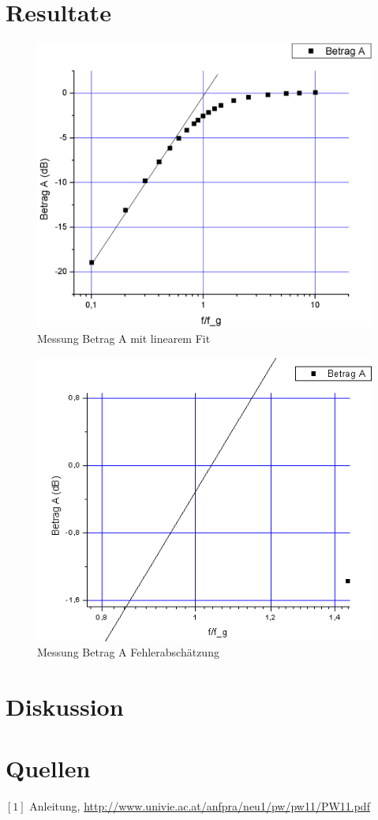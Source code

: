\documentclass[12pt,a4paper]{article}
\begin{document}
\begin{multicols}{2}
\section{Resultate}
\begin{figure}[H]
	\centering
	\includegraphics[scale=0.25]{./figure/betrag_a.png}
	\caption{Messung Betrag A mit linearem Fit}
	\label{fig:betraga_linfit}
\end{figure}
\begin{figure}[H]
	\centering
	\includegraphics[scale=0.45]{./figure/betrag_a_zoom.png}
	\caption{Messung Betrag A Fehlerabschätzung}
	\label{fig:betraga_abweichung}
\end{figure}

\section{Diskussion}



\section{Quellen}
$[1]$ Anleitung, \url{http://www.univie.ac.at/anfpra/neu1/pw/pw11/PW11.pdf}\\
\end{multicols}
\end{document}
